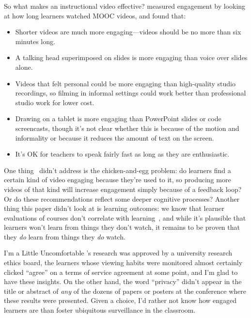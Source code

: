 So what makes an instructional video effective?
\cite{Guo2014} measured engagement by looking at how long learners watched MOOC videos,
and found that:

\begin{itemize}

\item
  Shorter videos are much more engaging---videos should be no more than six minutes long.

\item
  A talking head superimposed on slides is more engaging than voice over slides alone.

\item
  Videos that felt personal could be more engaging than high-quality studio recordings,
  so filming in informal settings could work better than professional studio work for lower cost.

\item
  Drawing on a tablet is more engaging than PowerPoint slides or code screencasts,
  though it's not clear whether this is because of the motion and informality
  or because it reduces the amount of text on the screen.

\item
  It's OK for teachers to speak fairly fast as long as they are enthusiastic.

\end{itemize}

One thing~\cite{Guo2014} didn't address is the chicken-and-egg problem:
do learners find a certain kind of video engaging because they're used to it,
so producing more videos of that kind will increase engagement simply because of a feedback loop?
Or do these recommendations reflect some deeper cognitive processes?
Another thing this paper didn't look at is learning outcomes:
we know that learner evaluations of courses don't correlate with learning~\cite{Star2014,Uttl2017},
and while it's plausible that learners won't learn from things they don't watch,
it remains to be proven that they \emph{do} learn from things they \emph{do} watch.

\begin{aside}{I'm a Little Uncomfortable}
  \cite{Guo2014}'s research was approved by a university research ethics board,
  the learners whose viewing habits were monitored almost certainly clicked ``agree''
  on a terms of service agreement at some point,
  and I'm glad to have these insights.
  On the other hand,
  the word ``privacy'' didn't appear in the title or abstract
  of \emph{any} of the dozens of papers or posters at the conference where these results were presented.
  Given a choice,
  I'd rather not know how engaged learners are
  than foster ubiquitous surveillance in the classroom.
\end{aside}

